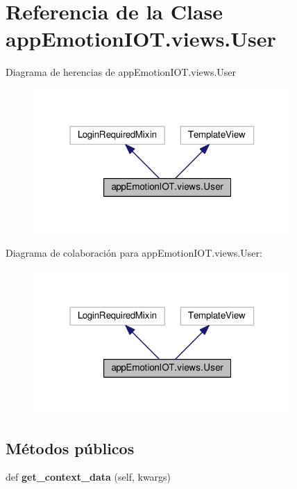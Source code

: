 \hypertarget{classappEmotionIOT_1_1views_1_1User}{}\section{Referencia de la Clase app\+Emotion\+I\+O\+T.\+views.\+User}
\label{classappEmotionIOT_1_1views_1_1User}


Diagrama de herencias de app\+Emotion\+I\+O\+T.\+views.\+User
\nopagebreak
\begin{figure}[H]
\begin{center}
\leavevmode
\includegraphics[width=279pt]{classappEmotionIOT_1_1views_1_1User__inherit__graph}
\end{center}
\end{figure}


Diagrama de colaboración para app\+Emotion\+I\+O\+T.\+views.\+User\+:
\nopagebreak
\begin{figure}[H]
\begin{center}
\leavevmode
\includegraphics[width=279pt]{classappEmotionIOT_1_1views_1_1User__coll__graph}
\end{center}
\end{figure}
\subsection*{Métodos públicos}
\begin{DoxyCompactItemize}
\item 
def {\bfseries get\+\_\+context\+\_\+data} (self, kwargs)\hypertarget{classappEmotionIOT_1_1views_1_1User_afb739ae15123223743ebedcb840e6b90}{}\label{classappEmotionIOT_1_1views_1_1User_afb739ae15123223743ebedcb840e6b90}

\end{DoxyCompactItemize}
